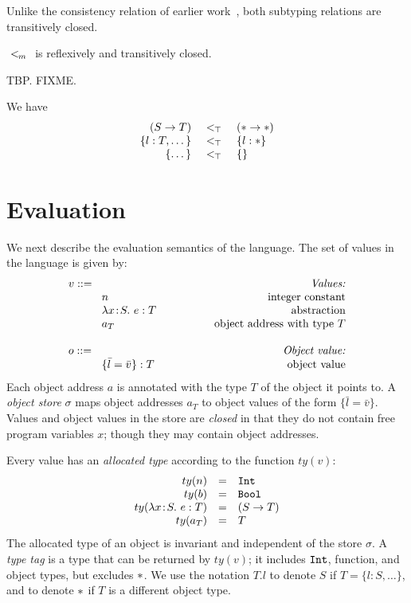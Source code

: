 \documentclass{article}
\newcommand{\lam}[4]{\lambda#1\!:\!#2.\,\,#4:#3}
\newcommand{\lamt}[2]{#1\rightarrow #2}
\newcommand{\Int}{\t{Int}}
\newcommand{\Bool}{\t{Bool}}
\newcommand{\dynamic}{\t{*}}
\newcommand{\subtypeword}[1]{\,\,<\!\!\!{\tiny{#1}}\,\,}
\renewcommand{\subtypeword}[1]{\,\,<\!\!_{\tiny{#1}}\,\,}
\renewcommand{\t}[1]{{\tt #1}}
\newcommand{\objty}[1]{\{#1\}}
\newcommand{\obje}[2]{\{#1\}:{#2}}
\newcommand{\objv}[1]{\{#1\}}
\newcommand{\allocty}[1]{ty(#1)}
\begin{document}
Unlike the consistency relation of earlier work~\cite{SiekTaha}, both subtyping relations are transitively closed.

\begin{lemma}
$\subtypeword{m}$ is reflexively and transitively closed.
\end{lemma}
TBP. FIXME.

We have
\[
\begin{array}{rcl}
	(\lamt{S}{T})  		&\subtypeword{\top}&  (\lamt\dynamic\dynamic) \\
	\objty{l:T,\dots}	&\subtypeword{\top}&  \objty{l:\dynamic} \\
	\objty{\dots}	   	&\subtypeword{\top}&  \objty{} \\
\end{array}
\]

\clearpage
\section{Evaluation}

We next describe the evaluation semantics of the language. 
The set of values in the language is given by:
\[
\begin{array}{llr}
	\mydefhead{v ::=\qquad\qquad\qquad\qquad\qquad}{Values:} 
	\mydefcase{n								}{integer constant} 
	\mydefcase{\lam{x}{S}{T}{e} 				}{abstraction} 
	\mydefcase{a_T							}{object address with type $T$}
	\\
	\mydefhead{o ::=\qquad\qquad\qquad\qquad\qquad}{Object value:} 
	\mydefcase{\obje{\bar l = \bar v}{T}		}{object value}
\end{array}
\]
Each object address $a$ is annotated with the type $T$ of the object it points to.
A \emph{object store} $\sigma$ maps object addresses $a_T$ to object values of the form $\objv{\bar{l}=\bar v}$.
Values and object values in the store are \emph{closed} in that they do not contain free program variables $x$;
though they may contain object addresses.

Every value has an \emph{allocated type} according to the function $\allocty{v}$:
\[
\begin{array}{rcll}
		\allocty{n}&=&\Int \\
		\allocty{b}&=&\Bool\\
		\allocty{\lam{x}{S}{T}{e}}&=&(\lamt{S}{T})\\
		\allocty{a_T}&=&T   
\end{array}
\]
The allocated type of an object is invariant and independent of the store $\sigma$. 
A \emph{type tag} is a type that can be returned by $\allocty{v}$; it includes $\Int$, function, and object types, but excludes $\dynamic$. 
We use the notation $T.l$ to denote $S$ if $T=\objty{l:S,\dots}$, and to denote $\dynamic$ if $T$ is a different object type.
\end{document}

